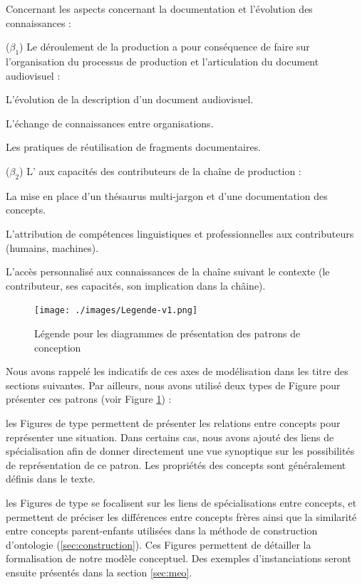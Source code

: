 Concernant les aspects concernant la documentation et l'évolution des connaissances : 
\begin{listeni}
\item[($\beta_1$)] Le déroulement de la production a pour conséquence de faire  sur l'organisation du processus de production et l'articulation du document audiovisuel : 
	\begin{liste}
		\item L'évolution de la description d'un document audiovisuel.
		\item L'échange de connaissances entre organisations.
		\item Les pratiques de réutilisation de fragments documentaires.
	\end{liste}

	\item[($\beta_2$)] L' aux capacités des contributeurs de la chaîne de production : 
	\begin{liste}
		\item La mise en place d'un thésaurus multi-jargon et d'une documentation des concepts.
		\item L'attribution de compétences linguistiques et professionnelles aux contributeurs (humains, machines).
		\item L'accès personnalisé aux connaissances de la chaîne suivant le contexte (le contributeur, ses capacités, son implication dans la châine).
	\end{liste}
\end{listeni}

\begin{figure}[ht!]
\centering
\texttt{[image: ./images/Legende-v1.png]}
\caption{Légende pour les diagrammes de présentation des patrons de conception}
\label{img:legende}
\end{figure}

Nous avons rappelé les indicatifs de ces axes de modélisation dans les titre des sections suivantes.
Par ailleurs, nous avons utilisé deux types de Figure pour présenter ces patrons (voir Figure \ref{img:legende}) : 
\begin{liste}
	\item les Figures de type  permettent de présenter les relations entre concepts pour représenter une situation. 
	Dans certains cas, nous avons ajouté des liens de spécialisation afin de donner directement une vue synoptique sur les possibilités de représentation de ce patron. 
	Les propriétés des concepts sont généralement définis dans le texte.

	\item les Figures de type  se focalisent sur les liens de spécialisations entre concepts, et permettent de préciser les différences entre concepts frères ainsi que la similarité entre concepts parent-enfants utilisées dans la méthode de construction d'ontologie  (\ref{sec:construction}).
	Ces Figures permettent de détailler la formalisation de notre modèle conceptuel. 
	Des exemples d'instanciations seront ensuite présentés dans la section \ref{sec:meo}.
\end{liste}